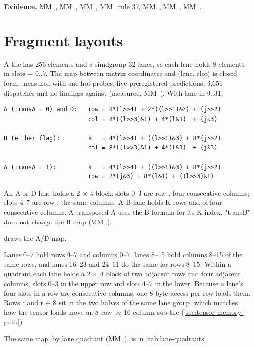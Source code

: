 \textbf{Evidence.} MM~, MM~, MM~, MM~ rule 37, MM~, MM~, MM~.

\section{Fragment layouts}\label{sec:fragment-layouts}

A tile has 256 elements and a simdgroup 32 lanes, so each lane holds 8 elements in slots  = 0..7. The map between
matrix coordinates and (lane, slot) is closed-form, measured with one-hot probes, five preregistered predictions,
6,651 dispatches and no findings against (measured, MM~). With lane  in 0..31:

\begin{lstlisting}
A (transA = 0) and D:   row = 8*(l>>4) + 2*((l>>1)&3) + (j>>2)
                        col = 8*((l>>3)&1) + 4*(l&1)  + (j&3)

B (either flag):        k   = 4*(l>>4) + ((l>>1)&3) + 8*(j>>2)
                        col = 8*((l>>3)&1) + 4*(l&1)  + (j&3)

A (transA = 1):         k   = 4*(l>>4) + ((l>>1)&3) + 8*(j>>2)
                        row = 2*(j&3) + 8*(l&1) + ((l>>3)&1)
\end{lstlisting}

An A or D lane holds a 2 × 4 block: slots 0–3 are row , four consecutive columns; slots 4–7 are row , the
same columns. A B lane holds K rows  and  of four consecutive columns. A transposed A uses the B formula for
its K index. "transB" does not change the B map (MM~).

 draws the A/D map.



Lanes 0–7 hold rows 0–7 and columns 0–7, lanes 8–15 hold columns 8–15 of the same rows, and lanes 16–23 and 24–31 do the
same for rows 8–15. Within a quadrant each lane holds a 2 × 4 block of two adjacent rows and four adjacent columns,
slots 0–3 in the upper row and slots 4–7 in the lower. Because a lane's four slots in a row are consecutive columns, one
8-byte access per row loads them. Rows r and r + 8 sit in the two halves of the same lane group, which matches how the
tensor loads move an 8-row by 16-column sub-tile (\cref{sec:tensor-memory-path}).

The same map, by lane quadrant (MM~), is in \cref{tab:lane-quadrants}.

